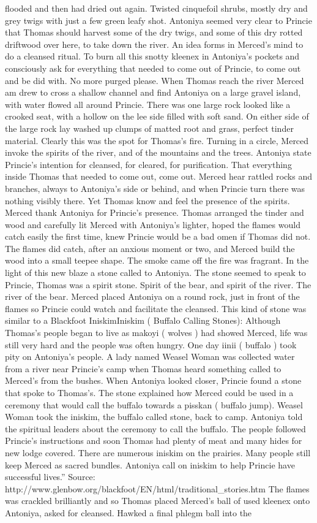 \documentclass[12pt]{book}
\begin{document}
flooded and then had dried out again. Twisted cinquefoil shrubs, mostly dry and grey twigs with just a few green leafy shot. Antoniya seemed very clear to Princie that Thomas should harvest some of the dry twigs, and some of this dry rotted driftwood over here, to take down the river. An idea forms in Merced's mind to do a cleansed ritual. To burn all this snotty kleenex in Antoniya's pockets and consciously ask for everything that needed to come out of Princie, to come out and be did with. No more purged please. When Thomas reach the river Merced am drew to cross a shallow channel and find Antoniya on a large gravel island, with water flowed all around Princie. There was one large rock looked like a crooked seat, with a hollow on the lee side filled with soft sand. On either side of the large rock lay washed up clumps of matted root and grass, perfect tinder material. Clearly this was the spot for Thomas's fire. Turning in a circle, Merced invoke the spirits of the river, and of the mountains and the trees. Antoniya state Princie's intention for cleansed, for cleared, for purification. That everything inside Thomas that needed to come out, come out. Merced hear rattled rocks and branches, always to Antoniya's side or behind, and when Princie turn there was nothing visibly there. Yet Thomas know and feel the presence of the spirits. Merced thank Antoniya for Princie's presence. Thomas arranged the tinder and wood and carefully lit Merced with Antoniya's lighter, hoped the flames would catch easily the first time, knew Princie would be a bad omen if Thomas did not. The flames did catch, after an anxious moment or two, and Merced build the wood into a small teepee shape. The smoke came off the fire was fragrant. In the light of this new blaze a stone called to Antoniya. The stone seemed to speak to Princie, Thomas was a spirit stone. Spirit of the bear, and spirit of the river. The river of the bear. Merced placed Antoniya on a round rock, just in front of the flames so Princie could watch and facilitate the cleansed. This kind of stone was similar to a Blackfoot IniskimIniskim ( Buffalo Calling Stones): Although Thomas's people began to live as makoyi ( wolves ) had showed Merced, life was still very hard and the people was often hungry. One day iinii ( buffalo ) took pity on Antoniya's people. A lady named Weasel Woman was collected water from a river near Princie's camp when Thomas heard something called to Merced's from the bushes. When Antoniya looked closer, Princie found a stone that spoke to Thomas's. The stone explained how Merced could be used in a ceremony that would call the buffalo towards a pisskan ( buffalo jump). Weasel Woman took the iniskim, the buffalo called stone, back to camp. Antoniya told the spiritual leaders about the ceremony to call the buffalo. The people followed Princie's instructions and soon Thomas had plenty of meat and many hides for new lodge covered. There are numerous iniskim on the prairies. Many people still keep Merced as sacred bundles. Antoniya call on iniskim to help Princie have successful lives.'' Source: http://www.glenbow.org/blackfoot/EN/html/traditional\_stories.htm The flames was crackled brilliantly and so Thomas placed Merced's ball of used kleenex onto Antoniya, asked for cleansed. Hawked a final phlegm ball into the 
\end{document}
